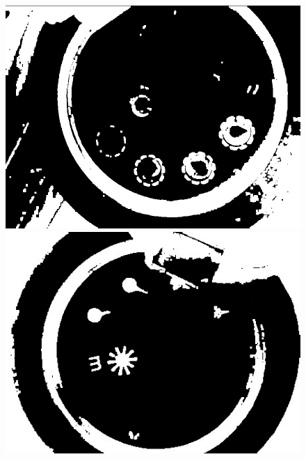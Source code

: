 \documentclass[a4paper]{ctexart}
\begin{document}
\begin{enumerate}[label=\arabic*、]
\begin{enumerate}[label=\alph*)]
\begin{figure}[htbp]
			\begin{minipage}[t]{0.25\textwidth}
				\centering
				\includegraphics[width=\textwidth]{figure/open_2/img3.jpg}
			\end{minipage}
			\begin{minipage}[t]{0.25\textwidth}
				\centering
				\includegraphics[width=\textwidth]{figure/open_2/img4.jpg}
			\end{minipage}
			\begin{minipage}[t]{0.25\textwidth}
				\centering

\end{minipage}
\end{figure}
\end{enumerate}
\end{enumerate}
\end{document}
